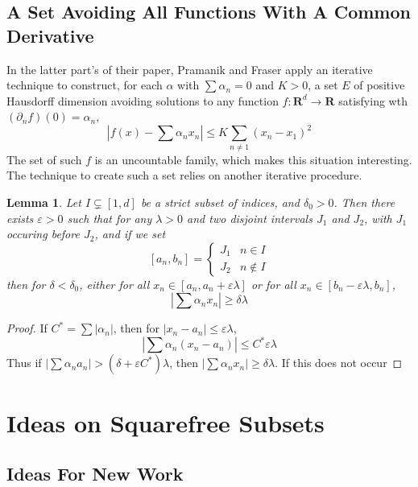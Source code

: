 \documentclass{report}
\theoremstyle{plain}
\newtheorem{lemma}{Lemma}
\theoremstyle{plain}
\begin{document}
\section{A Set Avoiding All Functions With A Common Derivative}

In the latter part's of their paper, Pramanik and Fraser apply an iterative technique to construct, for each $\alpha$ with $\sum \alpha_n = 0$ and $K > 0$, a set $E$ of positive Hausdorff dimension avoiding solutions to any function $f: \mathbf{R}^d \to \mathbf{R}$ satisfying wth $(\partial_n f)(0) = \alpha_n$,
%
\[ \left| f(x) - \sum \alpha_n x_n \right| \leq K \sum_{n \neq 1} (x_n - x_1)^2 \]
%
The set of such $f$ is an uncountable family, which makes this situation interesting. The technique to create such a set relies on another iterative procedure.

\begin{lemma}
    Let $I \subsetneq [1,d]$ be a strict subset of indices, and $\delta_0 > 0$. Then there exists $\varepsilon > 0$ such that for any $\lambda > 0$ and two disjoint intervals $J_1$ and $J_2$, with $J_1$ occuring before $J_2$, and if we set
    \[ [a_n,b_n] = \begin{cases} J_1 & n \in I \\ J_2 & n \not \in I \end{cases} \]
    then for $\delta < \delta_0$, either for all $x_n \in [a_n,a_n+\varepsilon \lambda]$ or for all $x_n \in [b_n - \varepsilon \lambda, b_n]$,
    \[ \left| \sum \alpha_n x_n \right| \geq \delta \lambda \]
\end{lemma}
\begin{proof}
    If $C^* = \sum |\alpha_n|$, then for $|x_n - a_n| \leq \varepsilon \lambda$,
    \[ |\sum \alpha_n (x_n - a_n)| \leq C^* \varepsilon \lambda \]
    Thus if $|\sum \alpha_n a_n| > (\delta + \varepsilon C^*)\lambda$, then $|\sum \alpha_n x_n| \geq \delta \lambda$. If this does not occur
\end{proof}











\chapter{Ideas on Squarefree Subsets}

\section{Ideas For New Work}
\end{document}

